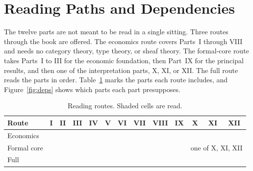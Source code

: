 \chapter*{Reading Paths and Dependencies}

The twelve parts are not meant to be read in a single sitting. Three routes through the book are offered. The economics route covers Parts~I through VIII and needs no category theory, type theory, or sheaf theory. The formal-core route takes Parts~I to III for the economic foundation, then Part~IX for the principal results, and then one of the interpretation parts, X, XI, or XII. The full route reads the parts in order. Table~\ref{tab:paths} marks the parts each route includes, and Figure~\ref{fig:deps} shows which parts each part presupposes.

\begin{table}[ht]
\centering
\renewcommand{\arraystretch}{1.25}
\setlength{\tabcolsep}{3.2pt}
\small
\begin{tabular}{@{}l*{12}{c}@{}}
\toprule
Route & I & II & III & IV & V & VI & VII & VIII & IX & X & XI & XII\\
\midrule
Economics &
 \cellcolor{black!25}& \cellcolor{black!25}& \cellcolor{black!25}& \cellcolor{black!25}&
 \cellcolor{black!25}& \cellcolor{black!25}& \cellcolor{black!25}& \cellcolor{black!25}&
 & & & \\
Formal core &
 \cellcolor{black!25}& \cellcolor{black!25}& \cellcolor{black!25}& & & & & &
 \cellcolor{black!25}& \multicolumn{3}{c}{\cellcolor{black!10}one of X, XI, XII}\\
Full &
 \cellcolor{black!25}& \cellcolor{black!25}& \cellcolor{black!25}& \cellcolor{black!25}&
 \cellcolor{black!25}& \cellcolor{black!25}& \cellcolor{black!25}& \cellcolor{black!25}&
 \cellcolor{black!25}& \cellcolor{black!25}& \cellcolor{black!25}& \cellcolor{black!25}\\
\bottomrule
\end{tabular}
\caption{Reading routes. Shaded cells are read.}
\label{tab:paths}
\end{table}

